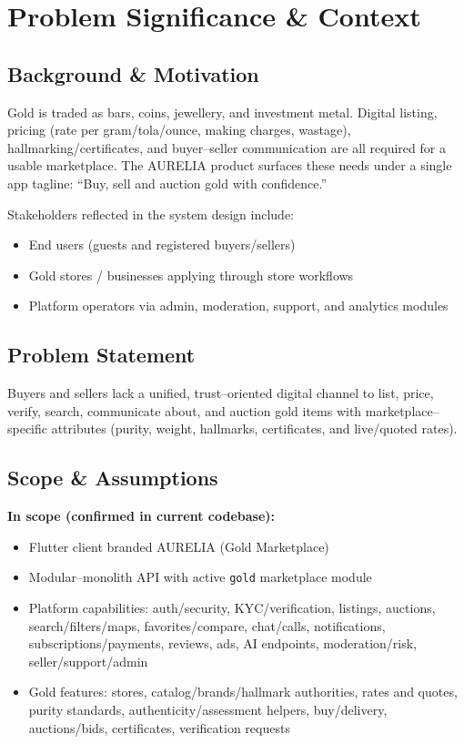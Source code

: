 \documentclass[11pt,a4paper]{article}
\begin{document}
\section{Problem Significance \& Context}

\subsection{Background \& Motivation}

Gold is traded as bars, coins, jewellery, and investment metal. Digital
listing, pricing (rate per gram/tola/ounce, making charges, wastage),
hallmarking/certificates, and buyer--seller communication are all required for
a usable marketplace. The AURELIA product surfaces these needs under a single
app tagline: ``Buy, sell and auction gold with confidence.''

Stakeholders reflected in the system design include:
\begin{itemize}[leftmargin=1.4em]
  \item End users (guests and registered buyers/sellers)
  \item Gold stores / businesses applying through store workflows
  \item Platform operators via admin, moderation, support, and analytics modules
\end{itemize}

\subsection{Problem Statement}

Buyers and sellers lack a unified, trust--oriented digital channel to list,
price, verify, search, communicate about, and auction gold items with
marketplace--specific attributes (purity, weight, hallmarks, certificates, and
live/quoted rates).

\subsection{Scope \& Assumptions}

\textbf{In scope (confirmed in current codebase):}
\begin{itemize}[leftmargin=1.4em]
  \item Flutter client branded AURELIA (Gold Marketplace)
  \item Modular--monolith API with active \texttt{gold} marketplace module
  \item Platform capabilities: auth/security, KYC/verification, listings,
        auctions, search/filters/maps, favorites/compare, chat/calls,
        notifications, subscriptions/payments, reviews, ads, AI endpoints,
        moderation/risk, seller/support/admin
  \item Gold features: stores, catalog/brands/hallmark authorities, rates and
        quotes, purity standards, authenticity/assessment helpers,
        buy/delivery, auctions/bids, certificates, verification requests
\end{itemize}
\end{document}

